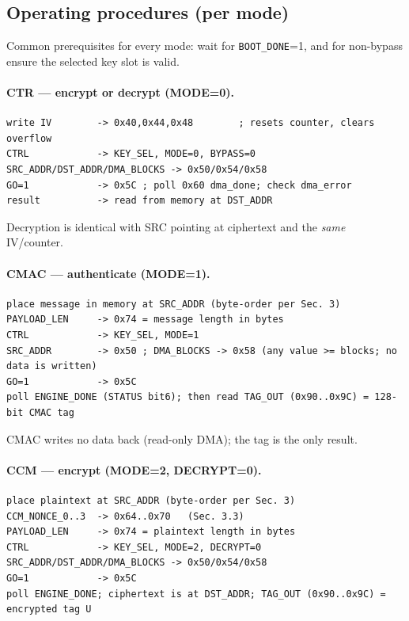 \documentclass[11pt,a4paper]{article}
\newcommand{\bit}[1]{\texttt{#1}}
\begin{document}
\subsection{Operating procedures (per mode)}
Common prerequisites for every mode: wait for \bit{BOOT\_DONE}=1, and for non-bypass ensure the
selected key slot is valid.

\paragraph{CTR --- encrypt or decrypt (MODE=0).}
\begin{lstlisting}
write IV        -> 0x40,0x44,0x48        ; resets counter, clears overflow
CTRL            -> KEY_SEL, MODE=0, BYPASS=0
SRC_ADDR/DST_ADDR/DMA_BLOCKS -> 0x50/0x54/0x58
GO=1            -> 0x5C ; poll 0x60 dma_done; check dma_error
result          -> read from memory at DST_ADDR
\end{lstlisting}
Decryption is identical with SRC pointing at ciphertext and the \emph{same} IV/counter.

\paragraph{CMAC --- authenticate (MODE=1).}
\begin{lstlisting}
place message in memory at SRC_ADDR (byte-order per Sec. 3)
PAYLOAD_LEN     -> 0x74 = message length in bytes
CTRL            -> KEY_SEL, MODE=1
SRC_ADDR        -> 0x50 ; DMA_BLOCKS -> 0x58 (any value >= blocks; no data is written)
GO=1            -> 0x5C
poll ENGINE_DONE (STATUS bit6); then read TAG_OUT (0x90..0x9C) = 128-bit CMAC tag
\end{lstlisting}
CMAC writes no data back (read-only DMA); the tag is the only result.

\paragraph{CCM --- encrypt (MODE=2, DECRYPT=0).}
\begin{lstlisting}
place plaintext at SRC_ADDR (byte-order per Sec. 3)
CCM_NONCE_0..3  -> 0x64..0x70   (Sec. 3.3)
PAYLOAD_LEN     -> 0x74 = plaintext length in bytes
CTRL            -> KEY_SEL, MODE=2, DECRYPT=0
SRC_ADDR/DST_ADDR/DMA_BLOCKS -> 0x50/0x54/0x58
GO=1            -> 0x5C
poll ENGINE_DONE; ciphertext is at DST_ADDR; TAG_OUT (0x90..0x9C) = encrypted tag U
\end{lstlisting}
\end{document}
